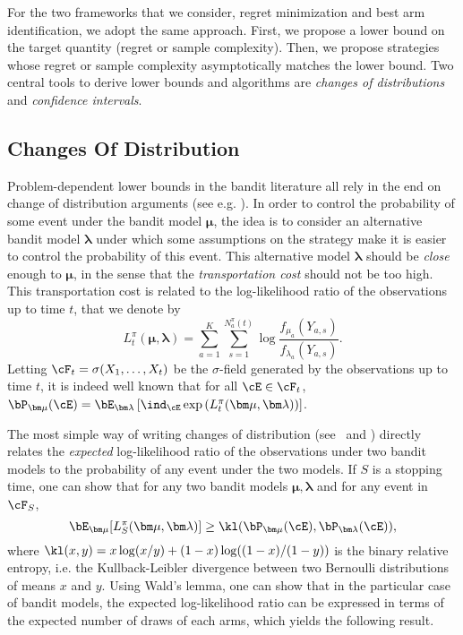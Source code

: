\documentclass[proc]{edpsmath}
\begin{document}
	
	For the two frameworks that we consider, regret minimization and best arm identification, we adopt the same approach. First, we propose a lower bound on the target quantity (regret or sample complexity). Then, we propose strategies whose regret or sample complexity asymptotically matches the lower bound. Two central tools to derive lower bounds and algorithms are \emph{changes of distributions} and \emph{confidence intervals}. 
	
	
	\subsection{Changes Of Distribution}\label{subsec:CD}
	
	Problem-dependent lower bounds in the bandit literature all rely in the end on change of distribution arguments (see e.g. \cite{LaiRobbins85bandits,BurnKat96,MannorTsi04,Bubeck10BestArm}). In order to control the probability of some event under the bandit model $\bm \mu$, the idea is to consider an alternative bandit model $\bm \lambda$ under which some assumptions on the strategy make it is easier to control the probability of this event. This alternative model $\bm\lambda$ should be \emph{close} enough to $\bm\mu$, in the sense that the \emph{transportation cost} should  not be too high. This transportation cost is related to the log-likelihood ratio of the observations up to time $t$, that we denote by 
	\[L_t^\pi(\bm\mu,\bm \lambda) = \sum_{a=1}^K \sum_{s=1}^{N_a^\pi(t)} \log \frac{f_{\mu_a}(Y_{a,s})}{f_{\lambda_a}(Y_{a,s})}.\]
	Letting $\cF_t = \sigma ( X_1,\dots, X_t)$ be the $\sigma$-field generated by the observations up to time $t$, it is indeed well known that for all $\cE \in \cF_t$, $\bP_{\bm\mu}(\cE) = \bE_{\bm \lambda}\left[\ind_{\cE} \exp\left(L_t^\pi(\bm \mu,\bm\lambda)\right)\right]$.
	
	The most simple way of writing changes of distribution (see~\cite{COLT14,Combes14Unimodal} and \cite{GMS16}) directly relates the \emph{expected} log-likelihood ratio of the observations under two bandit models to the probability of any event under the two models. If $S$ is a stopping time, one can show that for any two bandit models $\bm \mu, \bm \lambda$ and for any event in $\cF_{S}$,
	\[\bE_{\bm \mu}[L_S^\pi (\bm \mu,\bm \lambda)] \geq \kl(\bP_{\bm \mu}(\cE),\bP_{\bm \lambda}(\cE)),\]
	where $\kl(x,y) = x \log(x/y) + (1-x)\log((1-x)/(1-y))$ is the binary relative entropy, i.e. the Kullback-Leibler divergence between two Bernoulli distributions of means $x$ and $y$.
	Using Wald's lemma, one can show that in the particular case of bandit models, the expected log-likelihood ratio can be expressed in terms of the expected number of draws of each arms, which yields the following result. 
	
\end{document}
